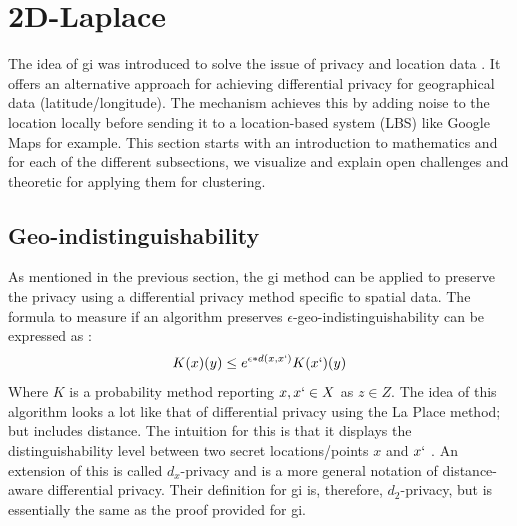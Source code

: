 
\section{2D-Laplace}
The idea of \gls{gi} was introduced to solve the issue of privacy and location data \citep{DBLP:journals/corr/abs-1212-1984}.
It offers an alternative approach for achieving differential privacy for geographical data (latitude/longitude).
The mechanism achieves this by adding noise to the location locally before sending it to a location-based system (LBS) like Google Maps for example.
This section starts with an introduction to mathematics and for each of the different subsections, we visualize and explain open challenges and theoretic for applying them for clustering.
\subsection*{Geo-indistinguishability}
As mentioned in the previous section, the \gls{gi} method can be applied to preserve the privacy using a differential privacy method specific to spatial data.
The formula to measure if an algorithm preserves $\epsilon$-geo-indistinguishability can be expressed as \citep{DBLP:journals/corr/abs-1212-1984}:
\begin{equation}
  K(x)(y) \le e^{\epsilon * d(x,x`)} K(x`)(y)
  \label{algo:2d-geo-indistinguishability}
\end{equation}
Where $K$ is a probability method reporting $x, x` \in X$ as $z \in Z$.
The idea of this algorithm looks a lot like that of differential privacy using the La Place method; but includes distance.
The intuition for this is that it displays the distinguishability level between two secret locations/points $x$ and $x`$ \citep{chatzikokolakis_constructing_2015}.
An extension of this is called $d_x$-privacy and is a more general notation of distance-aware differential privacy.
Their definition for \gls{gi} is, therefore, $d_2$-privacy, but is essentially the same as the proof provided for \gls{gi}.

